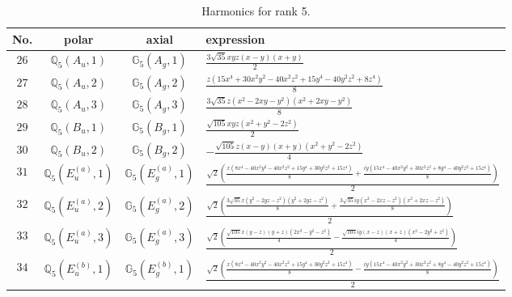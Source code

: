 \documentclass[fleqn,8pt,landscape]{jsarticle}
\begin{document}
\begin{table}[ht!]
\begin{center}
\caption{Harmonics for rank 5.}
\renewcommand{\arraystretch}{1.3}
\begin{tabular}{cccl} \hline \hline
No. & polar & axial & expression \\ \hline
$ 26 $ & $ \mathbb{Q}_{5}(A_{u},1) $ & $ \mathbb{G}_{5}(A_{g},1) $ & $ \frac{3 \sqrt{35} x y z \left(x - y\right) \left(x + y\right)}{2} $ \\
$ 27 $ & $ \mathbb{Q}_{5}(A_{u},2) $ & $ \mathbb{G}_{5}(A_{g},2) $ & $ \frac{z \left(15 x^{4} + 30 x^{2} y^{2} - 40 x^{2} z^{2} + 15 y^{4} - 40 y^{2} z^{2} + 8 z^{4}\right)}{8} $ \\
$ 28 $ & $ \mathbb{Q}_{5}(A_{u},3) $ & $ \mathbb{G}_{5}(A_{g},3) $ & $ \frac{3 \sqrt{35} z \left(x^{2} - 2 x y - y^{2}\right) \left(x^{2} + 2 x y - y^{2}\right)}{8} $ \\
$ 29 $ & $ \mathbb{Q}_{5}(B_{u},1) $ & $ \mathbb{G}_{5}(B_{g},1) $ & $ \frac{\sqrt{105} x y z \left(x^{2} + y^{2} - 2 z^{2}\right)}{2} $ \\
$ 30 $ & $ \mathbb{Q}_{5}(B_{u},2) $ & $ \mathbb{G}_{5}(B_{g},2) $ & $ - \frac{\sqrt{105} z \left(x - y\right) \left(x + y\right) \left(x^{2} + y^{2} - 2 z^{2}\right)}{4} $ \\
$ 31 $ & $ \mathbb{Q}_{5}(E_{u}^{(a)},1) $ & $ \mathbb{G}_{5}(E_{g}^{(a)},1) $ & $ \frac{\sqrt{2} \left(\frac{x \left(8 x^{4} - 40 x^{2} y^{2} - 40 x^{2} z^{2} + 15 y^{4} + 30 y^{2} z^{2} + 15 z^{4}\right)}{8} + \frac{i y \left(15 x^{4} - 40 x^{2} y^{2} + 30 x^{2} z^{2} + 8 y^{4} - 40 y^{2} z^{2} + 15 z^{4}\right)}{8}\right)}{2} $ \\
$ 32 $ & $ \mathbb{Q}_{5}(E_{u}^{(a)},2) $ & $ \mathbb{G}_{5}(E_{g}^{(a)},2) $ & $ \frac{\sqrt{2} \left(\frac{3 \sqrt{35} x \left(y^{2} - 2 y z - z^{2}\right) \left(y^{2} + 2 y z - z^{2}\right)}{8} + \frac{3 \sqrt{35} i y \left(x^{2} - 2 x z - z^{2}\right) \left(x^{2} + 2 x z - z^{2}\right)}{8}\right)}{2} $ \\
$ 33 $ & $ \mathbb{Q}_{5}(E_{u}^{(a)},3) $ & $ \mathbb{G}_{5}(E_{g}^{(a)},3) $ & $ \frac{\sqrt{2} \left(\frac{\sqrt{105} x \left(y - z\right) \left(y + z\right) \left(2 x^{2} - y^{2} - z^{2}\right)}{4} - \frac{\sqrt{105} i y \left(x - z\right) \left(x + z\right) \left(x^{2} - 2 y^{2} + z^{2}\right)}{4}\right)}{2} $ \\
$ 34 $ & $ \mathbb{Q}_{5}(E_{u}^{(b)},1) $ & $ \mathbb{G}_{5}(E_{g}^{(b)},1) $ & $ \frac{\sqrt{2} \left(\frac{x \left(8 x^{4} - 40 x^{2} y^{2} - 40 x^{2} z^{2} + 15 y^{4} + 30 y^{2} z^{2} + 15 z^{4}\right)}{8} - \frac{i y \left(15 x^{4} - 40 x^{2} y^{2} + 30 x^{2} z^{2} + 8 y^{4} - 40 y^{2} z^{2} + 15 z^{4}\right)}{8}\right)}{2} $ \\

\end{tabular}
\end{center}
\end{table}
\end{document}

